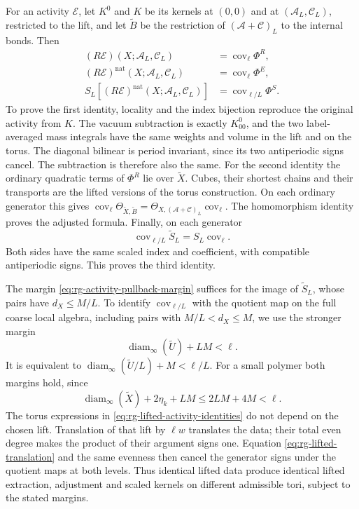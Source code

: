 For an activity $\mathscr E$, let $K^0$ and $K$ be its
kernels at $(0,0)$ and at $(\mathscr A_L,\mathscr C_L)$,
restricted to the lift, and let $\widetilde B$ be the
restriction of $(\mathscr A+\mathscr C)_L$ to the
internal bonds. Then
\begin{equation}\label{eq:rg-lifted-activity-identities}
 \begin{split}
 (R\mathscr E)(X;\mathscr A_L,\mathscr C_L)
                              &=\operatorname{cov}_\ell\Phi^R,\\
 (R\mathscr E)^{\mathrm{nat}}(X;\mathscr A_L,\mathscr C_L)
                              &=\operatorname{cov}_\ell\Phi^E,\\
 S_L[(R\mathscr E)^{\mathrm{nat}}(X;\mathscr A_L,\mathscr C_L)]
                              &=\operatorname{cov}_{\ell/L}\Phi^S.
 \end{split}
\end{equation}
To prove the first identity, locality and the index
bijection reproduce the original activity from $K$.
The vacuum subtraction is exactly $K^0_{00}$, and
the two label-averaged mass integrals have the same
weights and volume in the lift and on the torus.
The diagonal bilinear is period invariant, since its
two antiperiodic signs cancel. The subtraction is
therefore also the same.
For the second identity the ordinary quadratic terms
of $\Phi^R$ lie over $\widetilde X$. Cubes, their
shortest chains and their transports are the lifted
versions of the torus construction. On each ordinary
generator this gives
$\operatorname{cov}_\ell\Theta_{\widetilde X,\widetilde B}
=\Theta_{X,(\mathscr A+\mathscr C)_L}\operatorname{cov}_\ell$.
The homomorphism identity proves the adjusted formula.
Finally, on each generator
\[
 \operatorname{cov}_{\ell/L}\widetilde S_L
                                  =S_L\operatorname{cov}_\ell.
\]
Both sides have the same scaled index and coefficient,
with compatible antiperiodic signs. This proves the
third identity.

The margin \eqref{eq:rg-activity-pullback-margin}
suffices for the image of $\widetilde S_L$, whose
pairs have $d_X\le M/L$. To identify
$\operatorname{cov}_{\ell/L}$ with the quotient map
on the full coarse local algebra, including pairs
with $M/L<d_X\le M$, we use the stronger margin
\begin{equation}\label{eq:rg-full-coarse-pullback-margin}
 \operatorname{diam}_\infty(\widetilde U)+LM<\ell.
\end{equation}
It is equivalent to
$\operatorname{diam}_\infty(\widetilde U/L)+M<\ell/L$.
For a small polymer both margins hold, since
\[
 \operatorname{diam}_\infty(\widetilde X)+2\eta_k+LM
                    \le2LM+4M<\ell.
\]
The torus expressions in
\eqref{eq:rg-lifted-activity-identities} do not depend
on the chosen lift. Translation of that lift by $\ell w$
translates the data; their total even degree makes the
product of their argument signs one.
Equation \eqref{eq:rg-lifted-translation} and the same
evenness then cancel the generator signs under the
quotient maps at both levels.
Thus identical lifted data produce identical lifted
extraction, adjustment and scaled kernels on different
admissible tori, subject to the stated margins.

